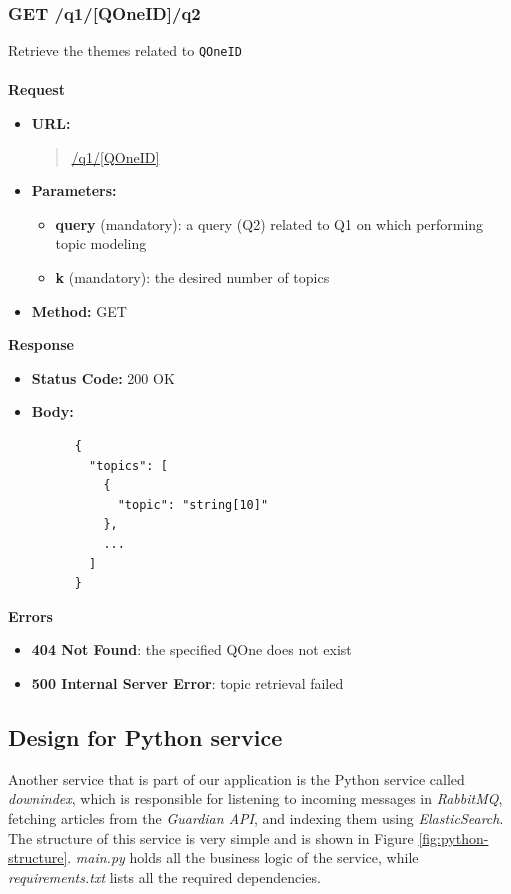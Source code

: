\subsubsection{GET /q1/[QOneID]/q2}
Retrieve the themes related to \verb|QOneID| \\\\
\textbf{Request}
\begin{itemize}
  \item \textbf{URL:}
  \begin{quote}
    \url{/q1/[QOneID]}
  \end{quote}
  \item \textbf{Parameters:}
    \begin{itemize}
      \item \textbf{query} (mandatory): a query (Q2) related to Q1 on which performing topic modeling
      \item \textbf{k} (mandatory): the desired number of topics
    \end{itemize}
  \item \textbf{Method:} GET
\end{itemize}\leavevmode\newline
\textbf{Response}
\begin{itemize}
  \item \textbf{Status Code:} 200 OK
  \item \textbf{Body:}
    \begin{lstlisting}
      {
        "topics": [
          {
            "topic": "string[10]"
          },
          ...
        ]
      }
    \end{lstlisting}
\end{itemize}\leavevmode\newline
\textbf{Errors}
\begin{itemize}
  \item \textbf{404 Not Found}: the specified QOne does not exist
  \item \textbf{500 Internal Server Error}: topic retrieval failed
\end{itemize}

\subsection{Design for Python service}
Another service that is part of our application is the Python service called \textit{downindex}, which is responsible for listening to incoming messages in \textit{RabbitMQ}, fetching articles from the \textit{Guardian API}, and indexing them using \textit{ElasticSearch}. The structure of this service is very simple and is shown in Figure \ref{fig:python-structure}. \textit{main.py} holds all the business logic of the service, while \textit{requirements.txt} lists all the required dependencies.

